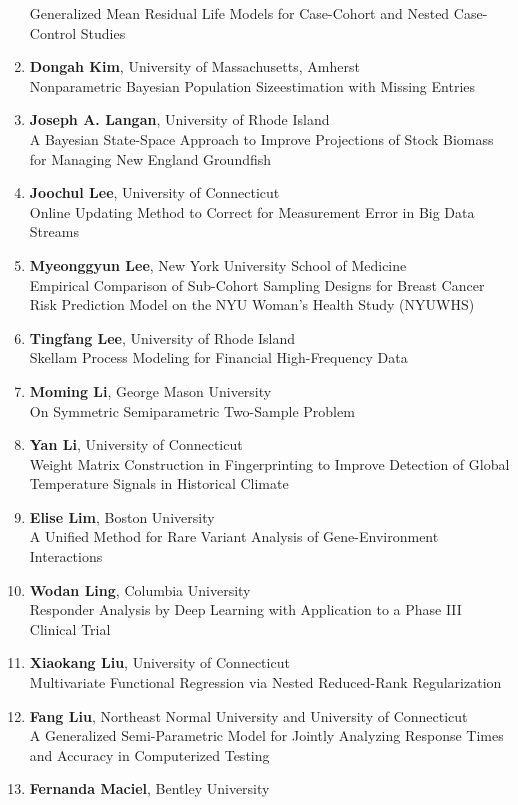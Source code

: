 \begin{enumerate}
Generalized Mean Residual Life Models for Case-Cohort and Nested Case-Control Studies
\item \textbf{Dongah Kim}, University of Massachusetts, Amherst \\
Nonparametric Bayesian Population Sizeestimation with Missing Entries
\item \textbf{Joseph A. Langan}, University of Rhode Island \\
A Bayesian State-Space Approach to Improve Projections of Stock Biomass for Managing New England Groundfish
\item \textbf{Joochul Lee}, University of Connecticut \\
Online Updating Method to Correct for Measurement Error in Big Data Streams
\item \textbf{Myeonggyun Lee}, New York University School of Medicine \\
Empirical Comparison of Sub-Cohort Sampling Designs for Breast Cancer Risk Prediction Model on the NYU Woman’s Health Study (NYUWHS)
\item \textbf{Tingfang Lee}, University of Rhode Island \\
Skellam Process Modeling for Financial High-Frequency Data
\item \textbf{Moming Li}, George Mason University \\
On Symmetric Semiparametric Two-Sample Problem
\item \textbf{Yan Li}, University of Connecticut \\
Weight Matrix Construction in Fingerprinting to Improve Detection of Global Temperature Signals in Historical Climate
\item \textbf{Elise Lim}, Boston University \\
A Unified Method for Rare Variant Analysis of Gene-Environment Interactions
\item \textbf{Wodan Ling}, Columbia University \\
Responder Analysis by Deep Learning with Application to a Phase III Clinical Trial
\item \textbf{Xiaokang Liu}, University of Connecticut \\
Multivariate Functional Regression via Nested Reduced-Rank Regularization
\item \textbf{Fang Liu}, Northeast Normal University and University of Connecticut \\
A Generalized Semi-Parametric Model for Jointly Analyzing Response Times and Accuracy in Computerized Testing
\item \textbf{Fernanda Maciel}, Bentley University \\

\end{enumerate}

